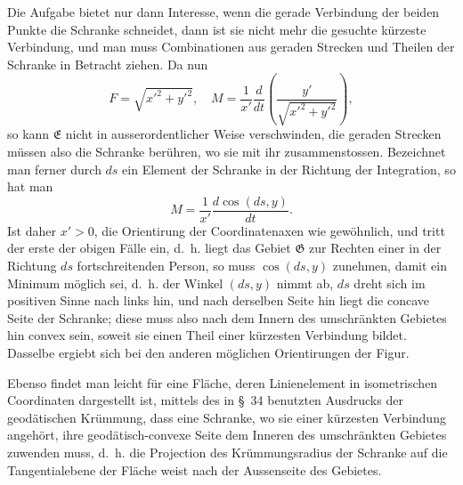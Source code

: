 \documentclass[11pt,a4paper,leqno]{article}
\begin{document}
Die Aufgabe bietet nur dann Interesse, wenn die gerade Verbindung der beiden Punkte die Schranke schneidet, dann ist sie nicht mehr die gesuchte kürzeste Verbindung, und man muss Combinationen aus geraden Strecken und Theilen der Schranke in Betracht ziehen. Da nun
\[
F=\sqrt{x'^2+y'^2},\quad
M=\frac{1}{x'}\frac{d}{dt}\left(\frac{y'}{\sqrt{x'^2+y'^2}}\right),
\]
so kann $\mathfrak{E}$ nicht in ausserordentlicher Weise verschwinden, die geraden Strecken müssen also die Schranke berühren, wo sie mit ihr zusammenstossen. Bezeichnet man ferner durch $ds$ ein Element der Schranke in der Richtung der Integration, so hat man
\[
M=\frac{1}{x'}\frac{d\cos(ds,y)}{dt}.
\]
Ist daher $x'>0$, die Orientirung der Coordinatenaxen wie gewöhnlich, und tritt der erste der obigen Fälle ein, d.~h. liegt das Gebiet $\mathfrak{G}$ zur Rechten einer in der Richtung $ds$ fortschreitenden Person, so muss $\cos(ds,y)$ zunehmen, damit ein Minimum möglich sei, d.~h. der Winkel $(ds,y)$ nimmt ab, $ds$ dreht sich im positiven Sinne nach links hin, und nach derselben Seite hin liegt die concave Seite der Schranke; diese muss also nach dem Innern des umschränkten Gebietes hin convex sein, soweit sie einen Theil einer kürzesten Verbindung bildet. Dasselbe ergiebt sich bei den anderen möglichen Orientirungen der Figur.

Ebenso findet man leicht für eine Fläche, deren Linienelement in isometrischen Coordinaten dargestellt ist, mittels des in \S~34 benutzten Ausdrucks der geodätischen Krümmung, dass
eine Schranke, wo sie einer kürzesten Verbindung angehört, ihre geodätisch-convexe Seite dem Inneren des umschränkten Gebietes zuwenden muss, d.~h. die Projection des Krümmungsradius der Schranke auf die Tangentialebene der Fläche weist nach der Aussenseite des Gebietes.
\end{document}
